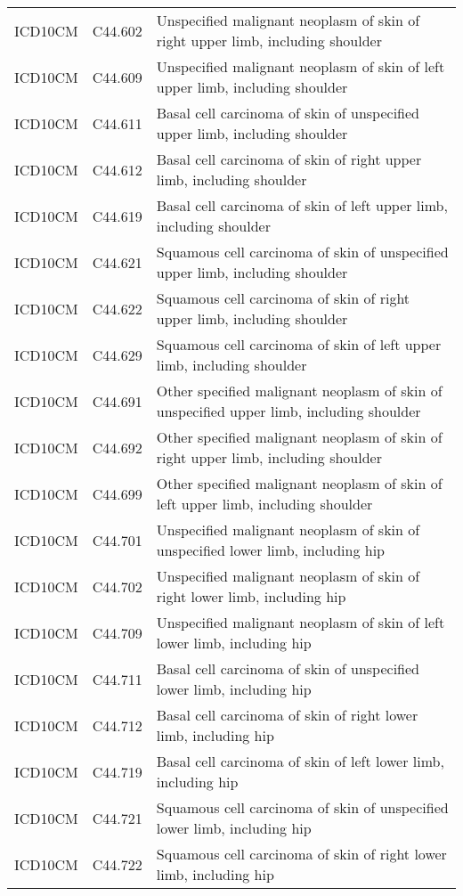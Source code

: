 \begin{longtable}{p{}p{}p{}}
  ICD10CM & C44.602 & Unspecified malignant neoplasm of skin of right upper limb, including shoulder \\ 
  ICD10CM & C44.609 & Unspecified malignant neoplasm of skin of left upper limb, including shoulder \\ 
  ICD10CM & C44.611 & Basal cell carcinoma of skin of unspecified upper limb, including shoulder \\ 
  ICD10CM & C44.612 & Basal cell carcinoma of skin of right upper limb, including shoulder \\ 
  ICD10CM & C44.619 & Basal cell carcinoma of skin of left upper limb, including shoulder \\ 
  ICD10CM & C44.621 & Squamous cell carcinoma of skin of unspecified upper limb, including shoulder \\ 
  ICD10CM & C44.622 & Squamous cell carcinoma of skin of right upper limb, including shoulder \\ 
  ICD10CM & C44.629 & Squamous cell carcinoma of skin of left upper limb, including shoulder \\ 
  ICD10CM & C44.691 & Other specified malignant neoplasm of skin of unspecified upper limb, including shoulder \\ 
  ICD10CM & C44.692 & Other specified malignant neoplasm of skin of right upper limb, including shoulder \\ 
  ICD10CM & C44.699 & Other specified malignant neoplasm of skin of left upper limb, including shoulder \\ 
  ICD10CM & C44.701 & Unspecified malignant neoplasm of skin of unspecified lower limb, including hip \\ 
  ICD10CM & C44.702 & Unspecified malignant neoplasm of skin of right lower limb, including hip \\ 
  ICD10CM & C44.709 & Unspecified malignant neoplasm of skin of left lower limb, including hip \\ 
  ICD10CM & C44.711 & Basal cell carcinoma of skin of unspecified lower limb, including hip \\ 
  ICD10CM & C44.712 & Basal cell carcinoma of skin of right lower limb, including hip \\ 
  ICD10CM & C44.719 & Basal cell carcinoma of skin of left lower limb, including hip \\ 
  ICD10CM & C44.721 & Squamous cell carcinoma of skin of unspecified lower limb, including hip \\ 
  ICD10CM & C44.722 & Squamous cell carcinoma of skin of right lower limb, including hip \\ 

\end{longtable}
